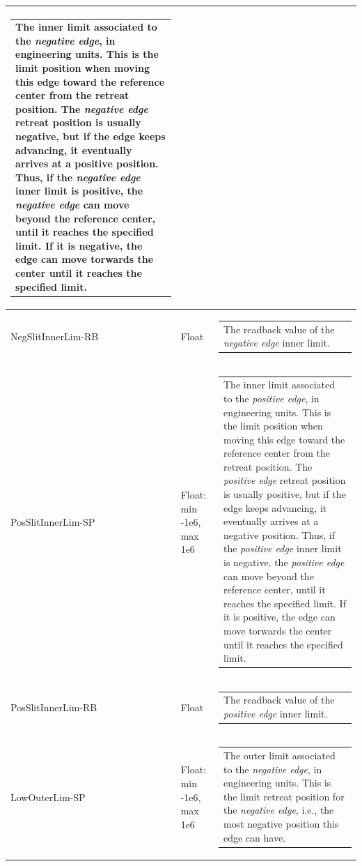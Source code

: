 \documentclass[openany]{article}
\begin{document}
\begin{longtable}{| m{4.5cm} m{2.5cm}  m{7.0cm} |}
\begin{tabular}{@{}m{6cm}@{}}
                The inner limit associated to the \emph{negative edge}, in engineering units. This is the limit position when moving this edge toward the reference center from the retreat position. The \emph{negative edge} retreat position is usually negative, but if the edge keeps advancing, it eventually arrives at a positive position. Thus, if the \emph{negative edge} inner limit is positive, the \emph{negative edge} can move beyond the reference center, until it reaches the specified limit. If it is negative, the edge can move torwards the center until it reaches the specified limit.
            \end{tabular} \hypertarget{}{}\\ \hline
        NegSlitInnerLim-RB & Float & \begin{tabular}{@{}m{6cm}@{}}
                The readback value of the \emph{negative edge} inner limit.
            \end{tabular} \hypertarget{pv:pos-edge-inner-lim}{}\\ \hline
        PosSlitInnerLim-SP & Float: min -1e6, max 1e6 & \begin{tabular}{@{}m{6cm}@{}}
                The inner limit associated to the \emph{positive edge}, in engineering units. This is the limit position when moving this edge toward the reference center from the retreat position. The \emph{positive edge} retreat position is usually positive, but if the edge keeps advancing, it eventually arrives at a negative position. Thus, if the \emph{positive edge} inner limit is negative, the \emph{positive edge} can move beyond the reference center, until it reaches the specified limit. If it is positive, the edge can move torwards the center until it reaches the specified limit.
            \end{tabular} \hypertarget{}{}\\ \hline
        PosSlitInnerLim-RB & Float & \begin{tabular}{@{}m{6cm}@{}}
                The readback value of the \emph{positive edge} inner limit.
            \end{tabular} \hypertarget{pv:low-outer-lim}{}\\ \hline
        LowOuterLim-SP & Float: min -1e6, max 1e6 & \begin{tabular}{@{}m{6cm}@{}}
                The outer limit associated to the \emph{negative edge}, in engineering units. This is the limit retreat position for the \emph{negative edge}, i.e., the most negative position this edge can have.

\end{tabular}
\end{longtable}
\end{document}
